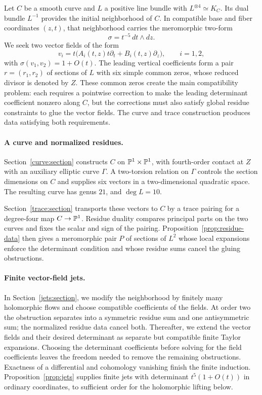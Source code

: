 Let $C$ be a smooth curve and $L$ a positive line bundle with
$L^{\otimes4}\simeq K_C$. Its dual bundle $L^{-1}$ provides the initial
neighborhood of $C$. In compatible base and fiber coordinates $(z,t)$,
that neighborhood carries the meromorphic two-form
\[
\sigma=t^{-5}\,dt\wedge dz.
\]
We seek two vector fields of the form
\[
v_i=t\bigl(A_i(t,z)t\partial_t+B_i(t,z)\partial_z\bigr),
\qquad i=1,2,
\]
with $\sigma(v_1,v_2)=1+O(t)$. The leading vertical coefficients form a
pair $r=(r_1,r_2)$ of sections of $L$ with six simple common zeros,
whose reduced divisor is denoted by $Z$. These common zeros create the
main compatibility problem: each requires a pointwise correction to make
the leading determinant coefficient nonzero along $C$, but the corrections must also satisfy
global residue constraints to glue the vector fields. The curve and trace
construction produces data satisfying both requirements.

\paragraph{A curve and normalized residues.}
Section~\ref{curve:section} constructs $C$ on $\mathbb P^1\times\mathbb P^1$, with
fourth-order contact at $Z$ with an auxiliary elliptic curve $\Gamma$.
A two-torsion relation on $\Gamma$ controls the section dimensions on $C$ and supplies
six vectors in a two-dimensional quadratic space. The resulting curve
has genus $21$, and $\deg L=10$.

Section~\ref{trace:section} transports these vectors to $C$ by a trace
pairing for a degree-four map $C\to\mathbb P^1$. Residue duality compares
principal parts on the two curves and fixes the scalar and sign of the
pairing. Proposition~\ref{prop:residue-data} then gives a meromorphic
pair $P$ of sections of $L^2$ whose local expansions enforce the determinant
condition and whose residue sums cancel the gluing obstructions.

\paragraph{Finite vector-field jets.}
In Section~\ref{jets:section}, we modify the neighborhood by finitely
many holomorphic flows and choose compatible coefficients of the fields.
At order two the obstruction separates into a symmetric residue sum and
one antisymmetric sum; the normalized residue data cancel both.
Thereafter, we extend the vector fields and their desired determinant
as separate but compatible finite Taylor expansions. Choosing the
determinant coefficients before solving for the field coefficients leaves
the freedom needed to remove the remaining obstructions. Exactness of a
differential and cohomology vanishing finish the finite induction.
Proposition~\ref{prop:jets} supplies finite jets
with determinant $t^5(1+O(t))$ in ordinary coordinates, to sufficient
order for the holomorphic lifting below.


